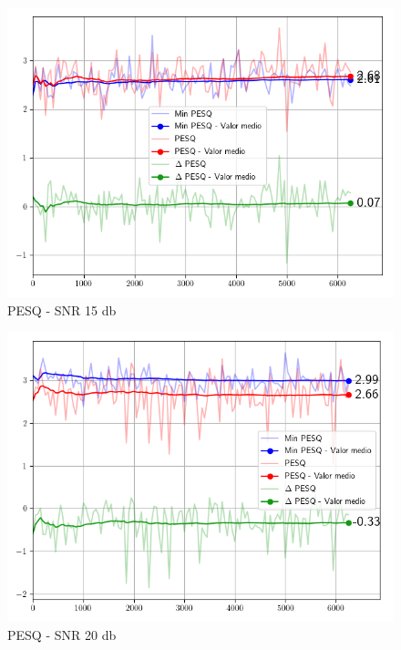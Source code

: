 \begin{figure}
	\centering
	\centerline{\includegraphics[scale=0.75]{images/ch6/af/objective_metrics/metric_PESQ_15db.png}}
	\caption{PESQ - SNR 15 db}
	\label{fig:ch6_pesq_fifteen_db}
\end{figure}

\begin{figure}
	\centering
	\centerline{\includegraphics[scale=0.75]{images/ch6/af/objective_metrics/metric_PESQ_20db.png}}
	\caption{PESQ - SNR 20 db}
	\label{fig:ch6_pesq_tweenty_db}
\end{figure}

